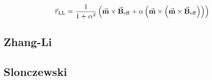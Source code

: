 \documentclass[12pt]{article}
\newcommand{\vc}[1]{\ensuremath{\vec{\textbf{#1}}}}
\newcommand{\m}{\vc{m}}
\newcommand{\B}[1]{\vc{B}_\mathrm{#1}}
\newcommand{\Beff}{\B{eff}}
\newcommand{\tq}[1]{\vc{\ensuremath{\tau}}\ensuremath{_\mathrm{#1}}}
\newcommand{\damp}{\ensuremath{\alpha}}
\begin{document}
\begin{equation}
	\tq{LL} = \frac{1}{1+\damp^2} \left(  \m \times \Beff  +\damp\left( \m \times \left( \m \times \Beff \right)\right)   \right)
\end{equation}

\subsection{Zhang-Li}
\subsection{Slonczewski}

%
%
%
%
%
%
%
%
%
%
%
%
%
%
%
%
%
%
%
%
%
%
%
\end{document}
